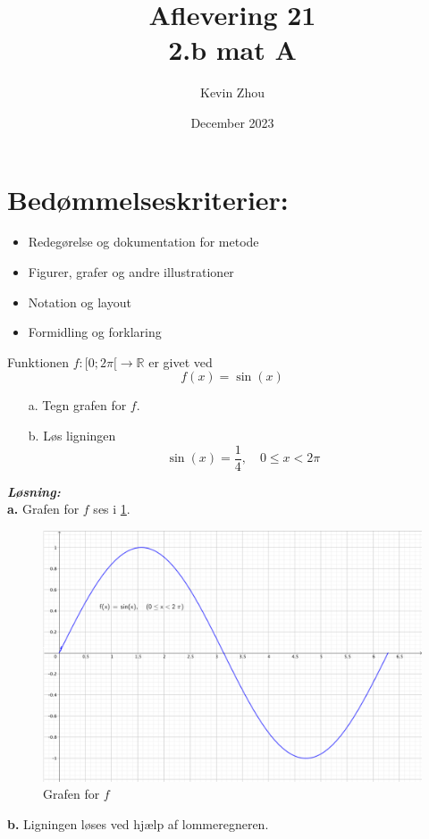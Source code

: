 \documentclass{article}
\title{Aflevering 21\\
{\Large \textbf{2.b mat A}}}
\author{Kevin Zhou}
\date{December 2023}
\newcommand{\sol}{\setlength{\parindent}{0cm}\textbf{\textit{Løsning:}}\setlength{\parindent}{1cm}}
\begin{document}
\maketitle
\section*{Bedømmelseskriterier:}
\begin{itemize}
    \setlength\itemsep{3cm}
    \Large
    \item  Redegørelse og dokumentation for metode
    \item Figurer, grafer og andre illustrationer
    \item Notation og layout
    \item Formidling og forklaring
\end{itemize}
\pagebreak
\begin{question}{}{}
  Funktionen $f:[0;2\pi[\to \mathbb{R}$ er givet ved
  \[
  f(x)= \sin(x)
  \] 
  \begin{itemize}
    \item[a.] Tegn grafen for $f$.
    \item[b.] Løs ligningen 
    \[
    \sin(x)=\frac{1}{4},\quad 0\leq x < 2\pi
    \] 
  \end{itemize}
\end{question}
\sol \\ 
\textbf{a.} Grafen for $f$ ses i \cref{fig:sin}.
\begin{figure}[H]
\begin{center}
  \includegraphics[width=\textwidth]{sin.png}
\end{center}
\caption{Grafen for $f$}
\label{fig:sin}
\end{figure}
\noindent \textbf{b.} Ligningen løses ved hjælp af lommeregneren.
\end{document}
